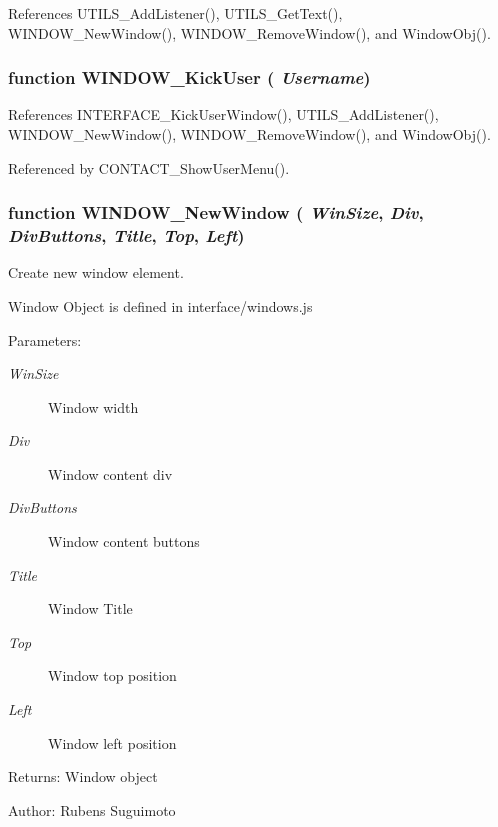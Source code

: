 References UTILS\_\-AddListener(), UTILS\_\-GetText(), WINDOW\_\-NewWindow(), WINDOW\_\-RemoveWindow(), and WindowObj().
\subsubsection[WINDOW\_\-KickUser]{\setlength{\rightskip}{0pt plus 5cm}function WINDOW\_\-KickUser ( {\em Username})}\label{window_2window_8js_3290d97c970c392b43ddb909ff4215d4}




References INTERFACE\_\-KickUserWindow(), UTILS\_\-AddListener(), WINDOW\_\-NewWindow(), WINDOW\_\-RemoveWindow(), and WindowObj().

Referenced by CONTACT\_\-ShowUserMenu().
\subsubsection[WINDOW\_\-NewWindow]{\setlength{\rightskip}{0pt plus 5cm}function WINDOW\_\-NewWindow ( {\em WinSize}, \/   {\em Div}, \/   {\em DivButtons}, \/   {\em Title}, \/   {\em Top}, \/   {\em Left})}\label{window_2window_8js_e550243841f359635cf1a6b8e88a2dda}


Create new window element. 

Window Object is defined in interface/windows.js

\begin{Desc}
\item[Parameters:]
\begin{description}
\item[{\em WinSize}]Window width \item[{\em Div}]Window content div \item[{\em DivButtons}]Window content buttons \item[{\em Title}]Window Title \item[{\em Top}]Window top position \item[{\em Left}]Window left position \end{description}
\end{Desc}
\begin{Desc}
\item[Returns:]Window object \end{Desc}
\begin{Desc}
\item[Author:]Rubens Suguimoto \end{Desc}


